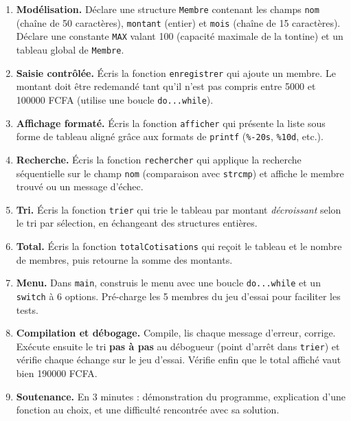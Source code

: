 \documentclass[11pt]{article}
\newcounter{popsec}
\newcounter{popsub}
\newcommand{\courssub}[1]{%
  \stepcounter{popsub}%
  \par\vspace{9pt}\noindent{\popxbold\fontsize{11.5}{13}\selectfont\color{popink}{\color{poporange}\thepopsec.\thepopsub}\hspace{6pt}#1}\par\nopagebreak\vspace{4pt}
}
\begin{document}
\begin{enumerate}
  \item \textbf{Modélisation.} Déclare une structure \texttt{Membre} contenant les champs \texttt{nom} (chaîne de 50 caractères), \texttt{montant} (entier) et \texttt{mois} (chaîne de 15 caractères). Déclare une constante \texttt{MAX} valant 100 (capacité maximale de la tontine) et un tableau global de \texttt{Membre}.
  \item \textbf{Saisie contrôlée.} Écris la fonction \texttt{enregistrer} qui ajoute un membre. Le montant doit être redemandé tant qu'il n'est pas compris entre \num{5000} et \num{100000} FCFA (utilise une boucle \texttt{do...while}).
  \item \textbf{Affichage formaté.} Écris la fonction \texttt{afficher} qui présente la liste sous forme de tableau aligné grâce aux formats de \texttt{printf} (\texttt{\%-20s}, \texttt{\%10d}, etc.).
  \item \textbf{Recherche.} Écris la fonction \texttt{rechercher} qui applique la recherche séquentielle sur le champ \texttt{nom} (comparaison avec \texttt{strcmp}) et affiche le membre trouvé ou un message d'échec.
  \item \textbf{Tri.} Écris la fonction \texttt{trier} qui trie le tableau par montant \emph{décroissant} selon le tri par sélection, en échangeant des structures entières.
  \item \textbf{Total.} Écris la fonction \texttt{totalCotisations} qui reçoit le tableau et le nombre de membres, puis retourne la somme des montants.
  \item \textbf{Menu.} Dans \texttt{main}, construis le menu avec une boucle \texttt{do...while} et un \texttt{switch} à 6 options. Pré-charge les 5 membres du jeu d'essai pour faciliter les tests.
  \item \textbf{Compilation et débogage.} Compile, lis chaque message d'erreur, corrige. Exécute ensuite le tri \textbf{pas à pas} au débogueur (point d'arrêt dans \texttt{trier}) et vérifie chaque échange sur le jeu d'essai. Vérifie enfin que le total affiché vaut bien \num{190000} FCFA.
  \item \textbf{Soutenance.} En 3 minutes : démonstration du programme, explication d'une fonction au choix, et une difficulté rencontrée avec sa solution.
\end{enumerate}

\courssub{Ressources à mobiliser}
\end{document}
